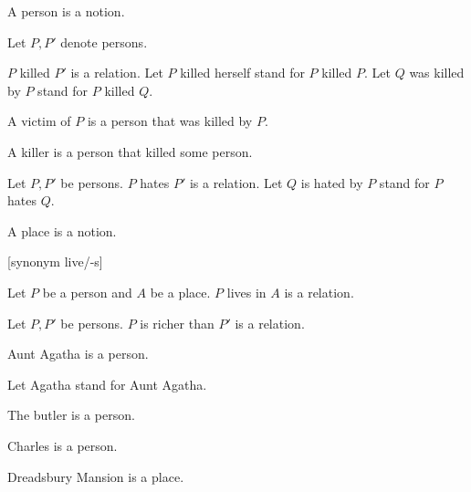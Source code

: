 \documentclass{article}
\begin{document}
\begin{forthel}

  \begin{signature}
    A person is a notion.
  \end{signature}

  Let $P, P'$ denote persons.

  \begin{signature}
    $P$ killed $P'$ is a relation.
    Let $P$ killed herself stand for $P$ killed $P$.
    Let $Q$ was killed by $P$ stand for $P$ killed $Q$.
  \end{signature}

  \begin{definition}
    A victim of $P$ is a person that was killed by $P$.
  \end{definition}

  \begin{definition}
    A killer is a person that killed some person.
  \end{definition}

  \begin{signature}
    Let $P, P'$ be persons.
    $P$ hates $P'$ is a relation.
    Let $Q$ is hated by $P$ stand for $P$ hates $Q$.
  \end{signature}

  \begin{signature}
    A place is a notion.
  \end{signature}

  [synonym live/-s]

  \begin{signature}
    Let $P$ be a person and $A$ be a place.
    $P$ lives in $A$ is a relation.
  \end{signature}

  \begin{signature}
    Let $P, P'$ be persons.
    $P$ is richer than $P'$ is a relation.
  \end{signature}

  \begin{signature}
    Aunt Agatha is a person.
  \end{signature}

  Let Agatha stand for Aunt Agatha.

  \begin{signature}
    The butler is a person.
  \end{signature}

  \begin{signature}
    Charles is a person.
  \end{signature}

  \begin{signature}
    Dreadsbury Mansion is a place.
  \end{signature}
\end{forthel}
\end{document}
